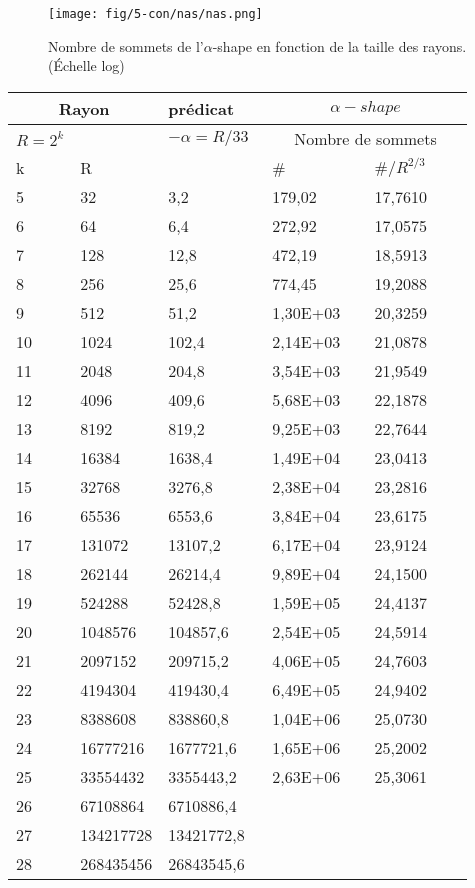 \begin{figure}[H]
  \centering
  \texttt{[image: fig/5-con/nas/nas.png]}
  \caption{Nombre de sommets de l'$\alpha$-shape en fonction de la taille des rayons. (Échelle log)}
\end{figure}


\begin{table}[H]
  \begin{tabular}{|p{0.09\linewidth}|p{0.13\linewidth}||p{0.23\linewidth}||p{0.23\linewidth}|p{0.23\linewidth}|}
    \hline
    \multicolumn{2}{|c||}{Rayon} & prédicat               & \multicolumn{2}{|c|}{$\alpha-shape$} \\  \hline 
    $R=2^k$  &                   & $-\alpha = R/33$ & \multicolumn{2}{|c|}{Nombre de sommets} \\ \hline
    k        & R                 &                        & \# & $\# / R^{2/3}$ \\ 
    \hline
    5  & 32        & 3,2        & 179,02   & 17,7610\\
    6  & 64        & 6,4        & 272,92   & 17,0575\\
    7  & 128       & 12,8       & 472,19   & 18,5913\\
    8  & 256       & 25,6       & 774,45   & 19,2088\\
    9  & 512       & 51,2       & 1,30E+03 & 20,3259\\
    10 & 1024      & 102,4      & 2,14E+03 & 21,0878\\
    11 & 2048      & 204,8      & 3,54E+03 & 21,9549\\
    12 & 4096      & 409,6      & 5,68E+03 & 22,1878\\
    13 & 8192      & 819,2      & 9,25E+03 & 22,7644\\
    14 & 16384     & 1638,4     & 1,49E+04 & 23,0413\\
    15 & 32768     & 3276,8     & 2,38E+04 & 23,2816\\
    16 & 65536     & 6553,6     & 3,84E+04 & 23,6175\\
    17 & 131072    & 13107,2    & 6,17E+04 & 23,9124\\
    18 & 262144    & 26214,4    & 9,89E+04 & 24,1500\\
    19 & 524288    & 52428,8    & 1,59E+05 & 24,4137\\
    20 & 1048576   & 104857,6   & 2,54E+05 & 24,5914\\
    21 & 2097152   & 209715,2   & 4,06E+05 & 24,7603\\
    22 & 4194304   & 419430,4   & 6,49E+05 & 24,9402\\
    23 & 8388608   & 838860,8   & 1,04E+06 & 25,0730\\
    24 & 16777216  & 1677721,6  & 1,65E+06 & 25,2002\\
    25 & 33554432  & 3355443,2  & 2,63E+06 & 25,3061\\
    26 & 67108864  & 6710886,4  &    &  \\
    27 & 134217728 & 13421772,8 &    &  \\
    28 & 268435456 & 26843545,6 &    &  \\


\end{tabular}
\end{table}
